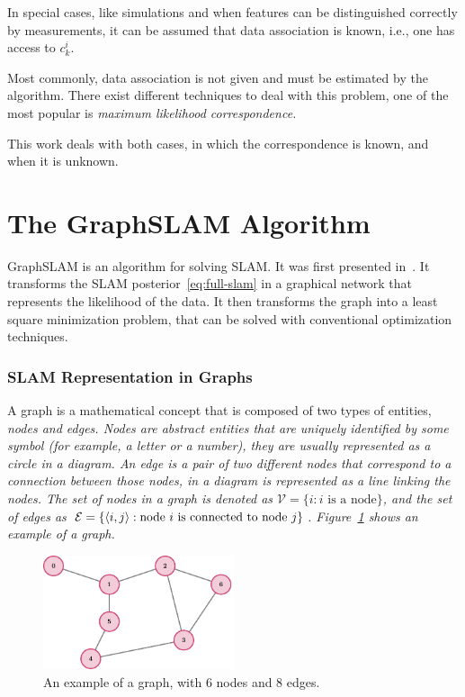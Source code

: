 In special cases, like simulations and when features can be distinguished correctly by measurements, it can be assumed that data association is known, i.e., one has access to $c_k^i$. 

Most commonly, data association is not given and must be estimated by the algorithm. There exist different techniques to deal with this problem, one of the most popular is \it{maximum likelihood correspondence}.

This work deals with both cases, in which the correspondence is known, and when it is unknown.

\section{The GraphSLAM Algorithm}
\label{sec:graphslam-description}

GraphSLAM is an algorithm for solving SLAM. It was first presented in~\cite{graphslam}. It transforms the SLAM posterior~\eqref{eq:full-slam} in a graphical network that represents the likelihood of the data. It then transforms the graph into a least square minimization problem, that can be solved with conventional optimization techniques.

\subsubsection{SLAM Representation in Graphs}

A graph is a mathematical concept that is composed of two types of entities, \it{nodes} and \it{edges}. Nodes are abstract entities that are uniquely identified by some symbol (for example, a letter or a number), they are usually represented as a circle in a diagram. An edge is a pair of two different nodes that correspond to a connection between those nodes, in a diagram is represented as a line linking the nodes. The set of nodes in a graph is denoted as $\mathcal{V} = \{i : i\text{ is a node}\}$, and the set of edges as $\mathcal{E} = \{\left<i,j\right>:\text{node }i\text{ is connected to node }j\}$. Figure~\ref{fig:graph} shows an example of a graph.

\begin{figure}[htbp!]
    \centering
    \includegraphics[width=0.5\textwidth]{tikz/graph.pdf}
    \caption[An example of a graph]{An example of a graph, with 6 nodes and 8 edges.}
    \label{fig:graph}
\end{figure}  

